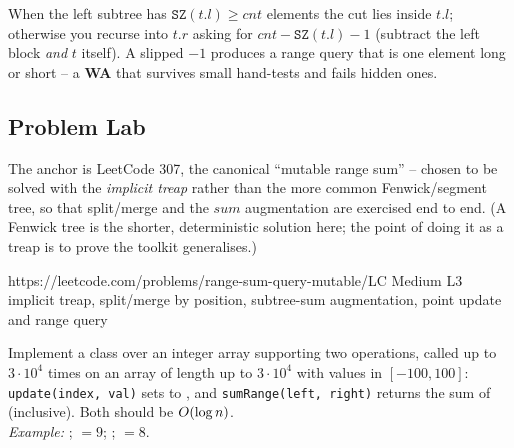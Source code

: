 \begin{warningbox}
When the left subtree has $\texttt{SZ}(t.l) \ge \mathit{cnt}$ elements the cut lies inside $t.l$; otherwise
you recurse into $t.r$ asking for $\mathit{cnt} - \texttt{SZ}(t.l) - 1$ (subtract the left block \emph{and}
$t$ itself). A slipped $-1$ produces a range query that is one element long or short -- a \textbf{WA} that
survives small hand-tests and fails hidden ones.
\end{warningbox}

\subsection{Problem Lab}

The anchor is LeetCode 307, the canonical ``mutable range sum'' -- chosen to be solved with the
\emph{implicit treap} rather than the more common Fenwick/segment tree, so that split/merge and the
$\mathit{sum}$ augmentation are exercised end to end. (A Fenwick tree  is the shorter,
deterministic solution here; the point of doing it as a treap is to prove the toolkit generalises.)

  {https://leetcode.com/problems/range-sum-query-mutable/}{LC Medium L3}
  {implicit treap, split/merge by position, subtree-sum augmentation, point update and range query}

\begin{problemstatement}
Implement a class  over an integer array  supporting two operations, called up
to $3\cdot 10^{4}$ times on an array of length up to $3\cdot 10^{4}$ with values in $[-100,100]$:
\texttt{update(index, val)} sets  to , and \texttt{sumRange(left, right)}
returns the sum of  (inclusive). Both should be $O(\log n)$.\\
\emph{Example:} ;  $=9$; ; 
$=8$.
\end{problemstatement}

